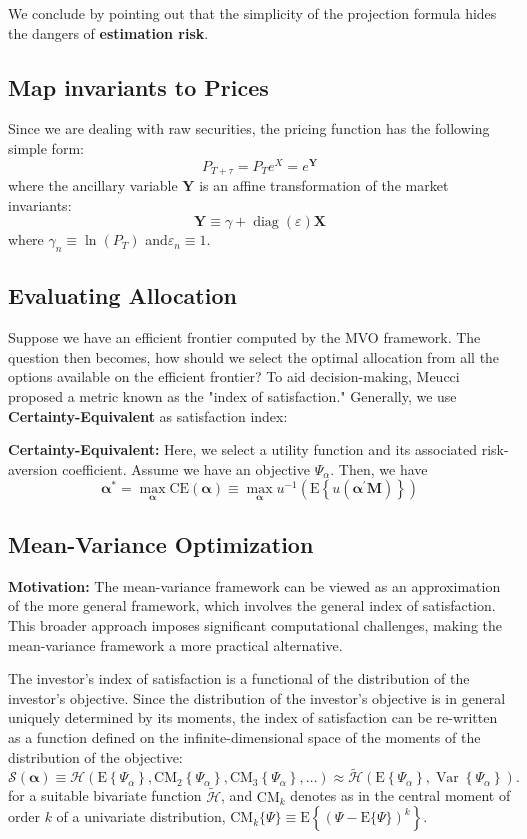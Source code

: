 \documentclass[13pt]{article}
\theoremstyle{definition}
\theoremstyle{remark}
\newenvironment{remark}
  {\pushQED{\qed}\renewcommand{\qedsymbol}{$\triangle$}\remarkx}
  {\popQED\endremarkx}
\begin{document}
\begin{remark}
    We conclude by pointing out that the simplicity of the projection formula hides the dangers of \textbf{estimation risk}. 
\end{remark}
\subsection{Map invariants to Prices}
Since we are dealing with raw securities, the pricing function has the following simple form:
$$
P_{T+\tau}=P_T e^X=e^{\mathbf{Y}}
$$
where the ancillary variable $\mathbf{Y}$ is an affine transformation of the market invariants:
$$
\mathbf{Y} \equiv \gamma+\operatorname{diag}(\varepsilon) \mathbf{X}
$$
where 
$\gamma_n \equiv\ln \left(P_T\right)$ and$\varepsilon_n \equiv1$.


\subsection{Evaluating Allocation}
Suppose we have an efficient frontier computed by the MVO framework. The question then becomes, how should we select the optimal allocation from all the options available on the efficient frontier? To aid decision-making, Meucci proposed a metric known as the "index of satisfaction." Generally, we use \textbf{Certainty-Equivalent} as satisfaction index:

\textbf{Certainty-Equivalent:} Here, we select a utility function and its associated risk-aversion coefficient. Assume we have an objective $\Psi_\alpha$. Then, we have
$$
\boldsymbol{\alpha}^* =\max_{\boldsymbol{\alpha}}\mathrm{CE}(\boldsymbol{\alpha}) \equiv \max_{\boldsymbol{\alpha}}u^{-1}\left(\mathrm{E}\left\{u\left(\boldsymbol{\alpha}^{\prime} \mathbf{M}\right)\right\}\right)
$$


\subsection{Mean-Variance Optimization}
{\color{C6}\textbf{Motivation:} The mean-variance framework can be viewed as an approximation of the more general framework, which involves the general index of satisfaction. This broader approach imposes significant computational challenges, making the mean-variance framework a more practical alternative.}


The investor's index of satisfaction is a functional of the distribution of the investor's objective. Since the distribution of the investor's objective is in general uniquely determined by its moments, the index of satisfaction can be re-written as a function defined on the infinite-dimensional space of the moments of the distribution of the objective:
$$
\mathcal{S}(\boldsymbol{\alpha}) \equiv \mathcal{H}\left(\mathrm{E}\left\{\Psi_\alpha\right\}, \mathrm{CM}_2\left\{\Psi_\alpha\right\}, \mathrm{CM}_3\left\{\Psi_\alpha\right\}, \ldots\right)\approx \tilde{\mathcal{H}}\left(\mathrm{E}\left\{\Psi_\alpha\right\}, \operatorname{Var}\left\{\Psi_\alpha\right\}\right) .
$$
for a suitable bivariate function $\tilde{\mathcal{H}}$, and $\mathrm{CM}_k$ denotes as in the central moment of order $k$ of a univariate distribution, $\mathrm{CM}_k\{\Psi\} \equiv \mathrm{E}\left\{(\Psi-\mathrm{E}\{\Psi\})^k\right\}$.
\end{document}

